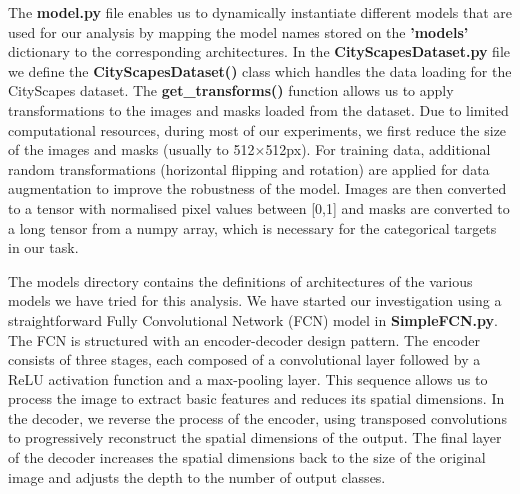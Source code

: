 The \textbf{model.py} file enables us to dynamically instantiate different models that are used for our analysis by mapping the model names stored on the \textbf{'models'} dictionary to the corresponding architectures. In the \textbf{CityScapesDataset.py} file we define the \textbf{CityScapesDataset()} class which handles the data loading for the CityScapes dataset. The \textbf{get\_transforms()} function allows us to apply transformations to the images and masks loaded from the dataset. Due to limited computational resources, during most of our experiments, we first reduce the size of the images and masks (usually to 512$\times$512px). For training data, additional random transformations (horizontal flipping and rotation) are applied for data augmentation to improve the robustness of the model. Images are then converted to a tensor with normalised pixel values between [0,1] and masks are converted to a long tensor from a numpy array, which is necessary for the categorical targets in our task. 

The models directory contains the definitions of architectures of the various models we have tried for this analysis. We have started our investigation using a straightforward Fully Convolutional Network (FCN) model in \textbf{SimpleFCN.py}. The FCN is structured with an encoder-decoder design pattern. The encoder consists of three stages, each composed of a convolutional layer followed by a ReLU activation function and a max-pooling layer. This sequence allows us to process the image to extract basic features and reduces its spatial dimensions. In the decoder, we reverse the process of the encoder, using transposed convolutions to progressively reconstruct the spatial dimensions of the output. The final layer of the decoder increases the spatial dimensions back to the size of the original image and adjusts the depth to the number of output classes. 

